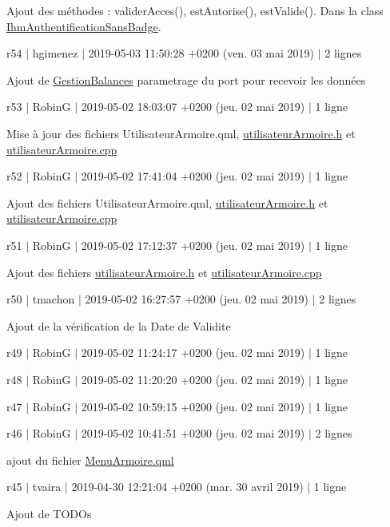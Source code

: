 Ajout des méthodes \+: valider\+Acces(), est\+Autorise(), est\+Valide(). Dans la class \hyperlink{class_ihm_authentification_sans_badge}{Ihm\+Authentification\+Sans\+Badge}.

r54 $\vert$ hgimenez $\vert$ 2019-\/05-\/03 11\+:50\+:28 +0200 (ven. 03 mai 2019) $\vert$ 2 lignes

Ajout de \hyperlink{class_gestion_balances}{Gestion\+Balances} parametrage du port pour recevoir les données

r53 $\vert$ RobinG $\vert$ 2019-\/05-\/02 18\+:03\+:07 +0200 (jeu. 02 mai 2019) $\vert$ 1 ligne

Mise à jour des fichiers Utilisateur\+Armoire.\+qml, \hyperlink{utilisateur_armoire_8h}{utilisateur\+Armoire.\+h} et \hyperlink{utilisateur_armoire_8cpp}{utilisateur\+Armoire.\+cpp}

r52 $\vert$ RobinG $\vert$ 2019-\/05-\/02 17\+:41\+:04 +0200 (jeu. 02 mai 2019) $\vert$ 1 ligne

Ajout des fichiers Utilisateur\+Armoire.\+qml, \hyperlink{utilisateur_armoire_8h}{utilisateur\+Armoire.\+h} et \hyperlink{utilisateur_armoire_8cpp}{utilisateur\+Armoire.\+cpp}

r51 $\vert$ RobinG $\vert$ 2019-\/05-\/02 17\+:12\+:37 +0200 (jeu. 02 mai 2019) $\vert$ 1 ligne

Ajout des fichiers \hyperlink{utilisateur_armoire_8h}{utilisateur\+Armoire.\+h} et \hyperlink{utilisateur_armoire_8cpp}{utilisateur\+Armoire.\+cpp}

r50 $\vert$ tmachon $\vert$ 2019-\/05-\/02 16\+:27\+:57 +0200 (jeu. 02 mai 2019) $\vert$ 2 lignes

Ajout de la vérification de la Date de Validite

r49 $\vert$ RobinG $\vert$ 2019-\/05-\/02 11\+:24\+:17 +0200 (jeu. 02 mai 2019) $\vert$ 1 ligne

r48 $\vert$ RobinG $\vert$ 2019-\/05-\/02 11\+:20\+:20 +0200 (jeu. 02 mai 2019) $\vert$ 1 ligne

r47 $\vert$ RobinG $\vert$ 2019-\/05-\/02 10\+:59\+:15 +0200 (jeu. 02 mai 2019) $\vert$ 1 ligne

r46 $\vert$ RobinG $\vert$ 2019-\/05-\/02 10\+:41\+:51 +0200 (jeu. 02 mai 2019) $\vert$ 2 lignes

ajout du fichier \hyperlink{_menu_armoire_8qml}{Menu\+Armoire.\+qml}

r45 $\vert$ tvaira $\vert$ 2019-\/04-\/30 12\+:21\+:04 +0200 (mar. 30 avril 2019) $\vert$ 1 ligne

Ajout de T\+O\+D\+Os

